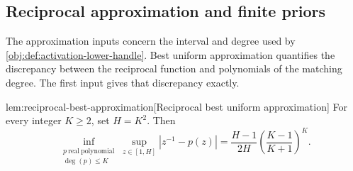 \documentclass[11pt]{article}
\begin{document}
\subsection{Reciprocal approximation and finite priors}

The approximation inputs concern the interval and degree used by \cref{obj:def:activation-lower-handle}. Best uniform approximation quantifies the discrepancy between the reciprocal function and polynomials of the matching degree. The first input gives that discrepancy exactly.

\begin{lemmav}{lem:reciprocal-best-approximation}[Reciprocal best uniform approximation]
For every integer \(K\ge 2\), set \(H=K^2\). Then
\[
\inf_{\substack{p\ \mathrm{real\ polynomial}\\ \deg(p)\le K}}
\sup_{z\in[1,H]}\left|z^{-1}-p(z)\right|
=
\frac{H-1}{2H}
\left(\frac{K-1}{K+1}\right)^K.
\]
\end{lemmav}
\end{document}
